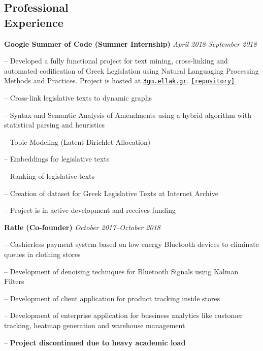 \documentclass[margin]{res}
\newcommand{\field}[2]{\noindent \textbf{#1} \hfill #2 \\}
\begin{document}
\begin{resume}
\section{Professional \\ Experience}
\field{Google Summer of Code (Summer Internship)}  {\emph{April 2018-September 2018}}
\begin{compactitem}
\item[--] Developed a fully functional project for text mining, cross-linking and automated codification of Greek Legislation using Natural Languaging Processing Methods and Practices. Project is hosted at \href{https://3gm.ellak.gr}{\nolinkurl{3gm.ellak.gr}}. \href{https://github.com/eellak/gsoc2018-3gm}{\nolinkurl{[repository]}}
\begin{compactitem}
\item[--] Cross-link legislative texts to dynamic graphs
\item[--] Syntax and Semantic Analysis of Amendments using a hybrid algorithm with statistical parsing and heuristics
\item[--] Topic Modeling (Latent Dirichlet Allocation)
\item[--] Embeddings for legislative texts
\item[--] Ranking of legislative texts
\item[--] Creation of dataset for Greek Legislative Texts at Internet Archive
\end{compactitem} 
\item[--] Project is in active development and receives funding
\end{compactitem}

\field{Ratle (Co-founder)} {\emph{October 2017--October 2018}}
\begin{compactitem}
\item[--] Cashierless payment system based on low energy Bluetooth devices to eliminate queues in clothing stores
\item[--] Development of denoising techniques for Bluetooth Signals using Kalman Filters 
\item[--] Development of client application for product tracking inside stores
\item[--] Development of enterprise application for bussiness analytics like customer tracking, heatmap generation and warehouse management
\item[--] \textbf{Project discontinued due to heavy academic load}
\end{compactitem}



\end{resume}
\end{document}

